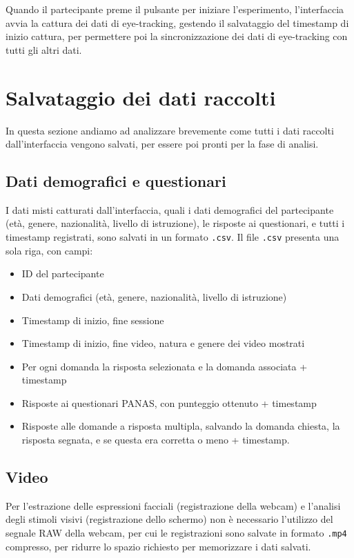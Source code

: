 Quando il partecipante preme il pulsante per iniziare l'esperimento, l'interfaccia avvia la cattura dei dati di eye-tracking, gestendo il salvataggio del timestamp di inizio cattura, per permettere poi la sincronizzazione dei dati di eye-tracking con tutti gli altri dati.

\section{Salvataggio dei dati raccolti}

In questa sezione andiamo ad analizzare brevemente come tutti i dati raccolti dall'interfaccia vengono salvati, per essere poi pronti per la fase di analisi.

\subsection{Dati demografici e questionari}

I dati misti catturati dall'interfaccia, quali i dati demografici del partecipante (età, genere, nazionalità, livello di istruzione), le risposte ai questionari, e tutti i timestamp registrati, sono salvati in un formato \verb|.csv|. Il file \verb|.csv| presenta una sola riga, con campi:
\begin{itemize}
    \item ID del partecipante
    \item Dati demografici (età, genere, nazionalità, livello di istruzione)
    \item Timestamp di inizio, fine sessione
    \item Timestamp di inizio, fine video, natura e genere dei video mostrati
    \item Per ogni domanda la risposta selezionata e la domanda associata + timestamp
    \item Risposte ai questionari PANAS, con punteggio ottenuto + timestamp
    \item Risposte alle domande a risposta multipla, salvando la domanda chiesta, la risposta segnata, e se questa era corretta o meno + timestamp.
\end{itemize}

\subsection{Video}

Per l'estrazione delle espressioni facciali (registrazione della webcam) e l'analisi degli stimoli visivi (registrazione dello schermo) non è necessario l'utilizzo del segnale RAW della webcam, per cui le registrazioni sono salvate in formato \verb|.mp4| compresso, per ridurre lo spazio richiesto per memorizzare i dati salvati.

